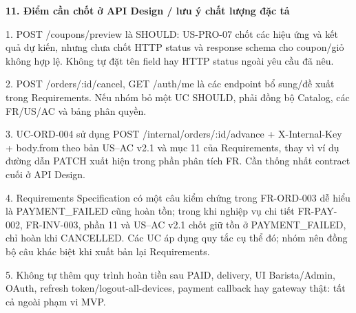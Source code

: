 \documentclass[11pt,a4paper,oneside]{report}
\begin{document}
\textbf{11. Điểm cần chốt ở API Design / lưu ý chất lượng đặc tả}

1. POST /coupons/preview là SHOULD: US-PRO-07 chốt các hiệu ứng và kết quả dự kiến, nhưng chưa chốt HTTP status và response schema cho coupon/giỏ không hợp lệ. Không tự đặt tên field hay HTTP status ngoài yêu cầu đã nêu.

2. POST /orders/:id/cancel, GET /auth/me là các endpoint bổ sung/đề xuất trong Requirements. Nếu nhóm bỏ một UC SHOULD, phải đồng bộ Catalog, các FR/US/AC và bảng phân quyền.

3. UC-ORD-004 sử dụng POST /internal/orders/:id/advance + X-Internal-Key + body.from theo bản US--AC v2.1 và mục 11 của Requirements, thay vì ví dụ đường dẫn PATCH xuất hiện trong phần phân tích FR. Cần thống nhất contract cuối ở API Design.

4. Requirements Specification có một câu kiểm chứng trong FR-ORD-003 dễ hiểu là PAYMENT\_FAILED cũng hoàn tồn; trong khi nghiệp vụ chi tiết FR-PAY-002, FR-INV-003, phần 11 và US--AC v2.1 chốt giữ tồn ở PAYMENT\_FAILED, chỉ hoàn khi CANCELLED. Các UC áp dụng quy tắc cụ thể đó; nhóm nên đồng bộ câu khác biệt khi xuất bản lại Requirements.

5. Không tự thêm quy trình hoàn tiền sau PAID, delivery, UI Barista/Admin, OAuth, refresh token/logout-all-devices, payment callback hay gateway thật: tất cả ngoài phạm vi MVP.
\end{document}
